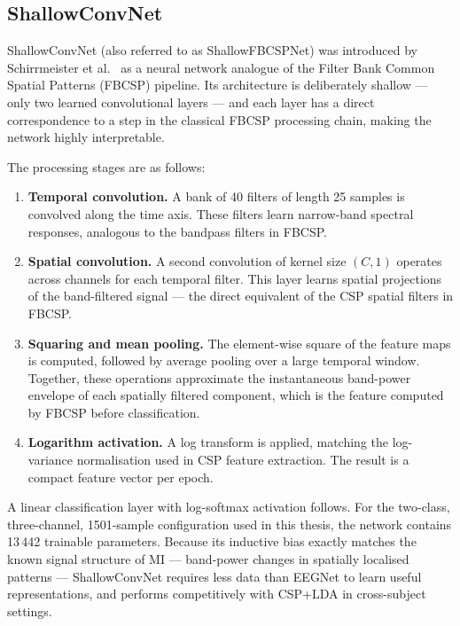 \documentclass[english, bc, kiv, he, iso690alph, pdf]{fasthesis}
\begin{document}
\subsection{ShallowConvNet}

ShallowConvNet (also referred to as ShallowFBCSPNet) was introduced by Schirrmeister et al.~\cite{schirrmeister2017deep} as a neural network analogue of the Filter Bank Common Spatial Patterns (FBCSP) pipeline. Its architecture is deliberately shallow — only two learned convolutional layers — and each layer has a direct correspondence to a step in the classical FBCSP processing chain, making the network highly interpretable.

The processing stages are as follows:

\begin{enumerate}
    \item \textbf{Temporal convolution.} A bank of 40 filters of length 25 samples is convolved along the time axis. These filters learn narrow-band spectral responses, analogous to the bandpass filters in FBCSP.
    \item \textbf{Spatial convolution.} A second convolution of kernel size $(C, 1)$ operates across channels for each temporal filter. This layer learns spatial projections of the band-filtered signal — the direct equivalent of the CSP spatial filters in FBCSP.
    \item \textbf{Squaring and mean pooling.} The element-wise square of the feature maps is computed, followed by average pooling over a large temporal window. Together, these operations approximate the instantaneous band-power envelope of each spatially filtered component, which is the feature computed by FBCSP before classification.
    \item \textbf{Logarithm activation.} A log transform is applied, matching the log-variance normalisation used in CSP feature extraction. The result is a compact feature vector per epoch.
\end{enumerate}

A linear classification layer with log-softmax activation follows. For the two-class, three-channel, 1501-sample configuration used in this thesis, the network contains 13\,442 trainable parameters. Because its inductive bias exactly matches the known signal structure of MI — band-power changes in spatially localised patterns — ShallowConvNet requires less data than EEGNet to learn useful representations, and performs competitively with CSP+LDA in cross-subject settings.
\end{document}
